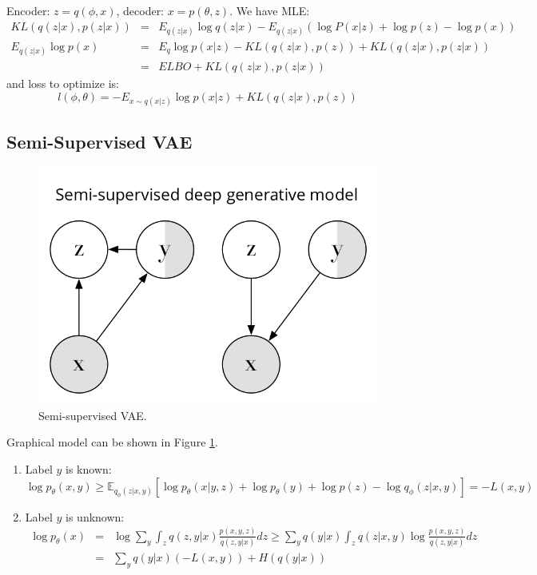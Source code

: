 \documentclass{article}
\begin{document}
Encoder: $z = q(\phi,x)$, decoder: $x=p(\theta,z)$. We have MLE:
\begin{eqnarray}
KL(q(z|x), p(z|x)) & = & E_{q(z|x)}\log q(z|x) -  E_{q(z|x)}(\log P(x|z) + \log p(z) - \log p(x)) \\
E_{q(z|x)}\log p(x) &=& E_q \log p(x|z) - KL(q(z|x), p(z)) + KL(q(z|x), p(z|x))\\
 &=& ELBO + KL(q(z|x), p(z|x))
\end{eqnarray}
and loss to optimize is:
\begin{equation}
l(\phi, \theta) = -E_{x\sim q(x|z)} \log p(x|z) + KL(q(z|x), p(z))
\end{equation}

\subsection{Semi-Supervised VAE}
\begin{figure}
	\begin{center}
		\includegraphics[width=.3\linewidth]{dgm.png}
	\end{center}
	\caption{Semi-supervised VAE.}
\label{fig-SSVAE}
\end{figure}

Graphical model can be shown in Figure \ref{fig-SSVAE}.
\begin{enumerate}
\item Label $y$ is known:
\begin{equation*}
\log p_{\theta}(x,y)\ge\mathbb{E}_{q_{\phi}(z|x,y)}[\log p_{\theta}(x|y,z)+\log p_{\theta}(y)+\log p(z)-\log q_{\phi}(z|x,y)]=-L(x,y)
\end{equation*}
\item Label $y$ is unknown:
\begin{eqnarray*}
\log p_{\theta}(x)&=&\log\sum_y\int_z q(z,y|x)\frac{p(x,y,z)}{q(z,y|x)}dz \ge \sum_y q(y|x)\int_z q(z|x,y)\log\frac{p(x,y,z)}{q(z,y|x)}dz\\
&=&\sum_y q(y|x)(-L(x,y)) + H(q(y|x))
\end{eqnarray*}
\end{enumerate}
\end{document}
